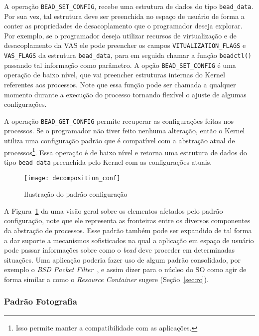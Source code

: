 A operação \texttt{BEAD\_SET\_CONFIG}, recebe uma estrutura de dados do tipo
\texttt{bead\_data}. Por sua vez, tal estrutura deve ser preenchida no espaço
de usuário de forma a conter as propriedades de desacoplamento que o
programador deseja explorar. Por exemplo, se o programador deseja utilizar
recursos de virtualização e de desacoplamento da VAS ele pode preencher os
campos \texttt{VITUALIZATION\_FLAGS} e \texttt{VAS\_FLAGS} da estrutura
\texttt{bead\_data}, para em seguida chamar a função \texttt{beadctl()}
passando tal informação como parâmetro. A opção \texttt{BEAD\_SET\_CONFIG} é
uma operação de baixo nível, que vai preencher estruturas internas do Kernel
referentes aos processos. Note que essa função pode ser chamada a qualquer
momento durante a execução do processo tornando flexível o ajuste de algumas
configurações.

A operação \texttt{BEAD\_GET\_CONFIG} permite recuperar as configurações feitas
nos processos. Se o programador não tiver feito nenhuma alteração, então o
Kernel utiliza uma configuração padrão que é compatível com a abstração atual
de processos\footnote{Isso permite manter a compatibilidade com as
aplicações.}. Essa operação é de baixo nível e retorna uma estrutura de dados
do tipo \texttt{bead\_data} preenchida pelo Kernel com as configurações atuais.

\begin{figure}[!h]
  \centering
  \texttt{[image: decomposition\_conf]}
  \caption{Ilustração do padrão configuração}
  \label{fig:decomposicao_conf}
\end{figure}

A Figura~\ref{fig:decomposicao_conf} da uma visão geral sobre os elementos
afetados pelo padrão configuração, note que ele representa as fronteiras entre
os diversos componentes da abstração de processos. Esse padrão também pode ser
expandido de tal forma a dar suporte a mecanismos sofisticados na qual a
aplicação em espaço de usuário pode passar informações sobre como o \emph{bead}
deve proceder em determinadas situações. Uma aplicação poderia fazer uso de
algum padrão consolidado, por exemplo o \emph{BSD Packet Filter}~\citep{bpf}, e
assim dizer para o núcleo do SO como agir de forma similar a como o
\emph{Resource Container} sugere (Seção~\ref{sec:rc}).

\subsubsection{Padrão Fotografia}
\label{sec:fotografia}

